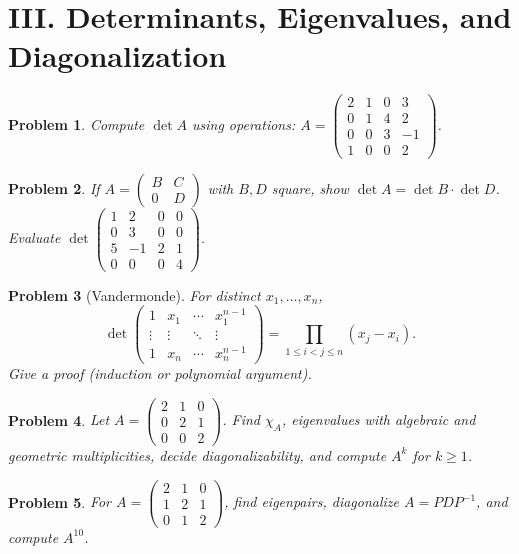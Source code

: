 \documentclass[11pt]{article}
\theoremstyle{upright}
\newtheorem{problem}{Problem}
\begin{document}
\section*{III. Determinants, Eigenvalues, and Diagonalization}

\begin{problem}
Compute $\det A$ using operations:
$A=\begin{pmatrix}2&1&0&3\\ 0&1&4&2\\ 0&0&3&-1\\ 1&0&0&2\end{pmatrix}$.
\end{problem}

\begin{problem}
If $A=\begin{pmatrix}B&C\\0&D\end{pmatrix}$ with $B,D$ square, show $\det A=\det B\cdot\det D$.
Evaluate $\det\begin{pmatrix}1&2&0&0\\0&3&0&0\\5&-1&2&1\\0&0&0&4\end{pmatrix}$.
\end{problem}

\begin{problem}[Vandermonde]
For distinct $x_1,\dots,x_n$,
\[
\det\begin{pmatrix}
1&x_1&\cdots&x_1^{n-1}\\
\vdots&\vdots&\ddots&\vdots\\
1&x_n&\cdots&x_n^{n-1}
\end{pmatrix}
=\prod_{1\le i<j\le n}(x_j-x_i).
\]
Give a proof (induction or polynomial argument).
\end{problem}

\begin{problem}
Let $A=\begin{pmatrix}2&1&0\\0&2&1\\0&0&2\end{pmatrix}$. 
Find $\chi_A$, eigenvalues with algebraic and geometric multiplicities, decide diagonalizability, and compute $A^k$ for $k\ge 1$.
\end{problem}

\begin{problem}
For $A=\begin{pmatrix}2&1&0\\1&2&1\\0&1&2\end{pmatrix}$, find eigenpairs, diagonalize $A=PDP^{-1}$, and compute $A^{10}$.
\end{problem}
\end{document}
